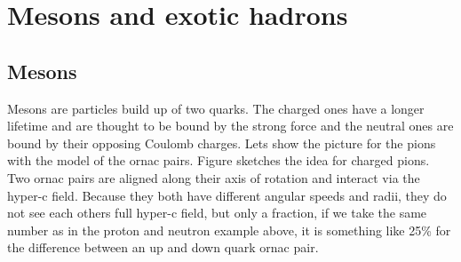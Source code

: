 \chapter{Mesons and exotic hadrons}


\section{Mesons}

Mesons are particles build up of two quarks. The charged ones have a longer lifetime and are thought to be bound by the strong force and the neutral ones are bound by their opposing Coulomb charges. Lets show the picture for the pions with the model of the ornac pairs. Figure  sketches the idea for charged pions. Two ornac pairs are aligned along their axis of rotation and interact via the hyper-c field. Because they both have different angular speeds and radii, they do not see each others full hyper-c field, but only a fraction, if we take the same number as in the proton and neutron example above, it is something like 25\% for the difference between an up and down quark ornac pair.


